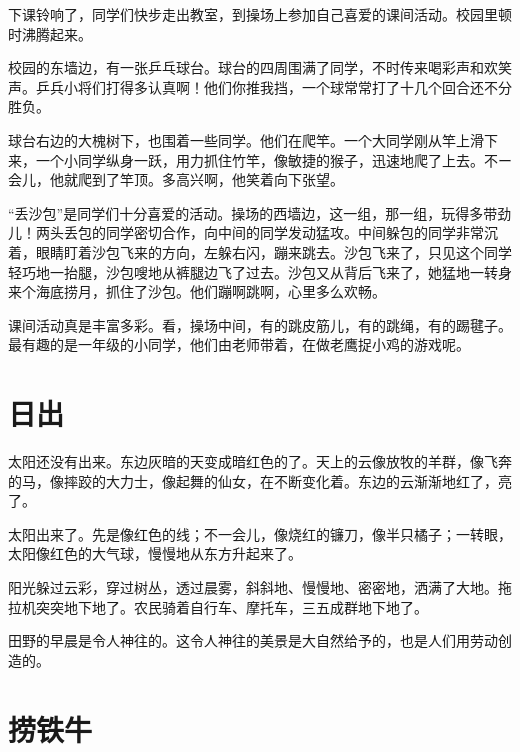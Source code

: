\documentclass[12pt,UTF-8,openany]{ctexbook}
\begin{document}
\begin{Large}
    
    下课铃响了，同学们快步走出教室，到操场上参加自己喜爱的课间活动。校园里顿时沸腾起来。
    
    校园的东墙边，有一张乒乓球台。球台的四周围满了同学，不时传来喝彩声和欢笑声。乒兵小将们打得多认真啊！他们你推我挡，一个球常常打了十几个回合还不分胜负。
    
    球台右边的大槐树下，也围着一些同学。他们在爬竿。一个大同学刚从竿上滑下来，一个小同学纵身一跃，用力抓住竹竿，像敏捷的猴子，迅速地爬了上去。不ー会儿，他就爬到了竿顶。多高兴啊，他笑着向下张望。
    
    “丢沙包”是同学们十分喜爱的活动。操场的西墙边，这一组，那一组，玩得多带劲儿！两头丢包的同学密切合作，向中间的同学发动猛攻。中间躲包的同学非常沉着，眼睛盯着沙包飞来的方向，左躲右闪，蹦来跳去。沙包飞来了，只见这个同学轻巧地一抬腿，沙包嗖地从裤腿边飞了过去。沙包又从背后飞来了，她猛地一转身来个海底捞月，抓住了沙包。他们蹦啊跳啊，心里多么欢畅。
    
    课间活动真是丰富多彩。看，操场中间，有的跳皮筋儿，有的跳绳，有的踢毽子。最有趣的是一年级的小同学，他们由老师带着，在做老鹰捉小鸡的游戏呢。
    
\end{Large}

\chapter{日出}

\begin{Large}
    
    太阳还没有出来。东边灰暗的天变成暗红色的了。天上的云像放牧的羊群，像飞奔的马，像摔跤的大力士，像起舞的仙女，在不断变化着。东边的云渐渐地红了，亮了。
    
    太阳出来了。先是像红色的线；不一会儿，像烧红的镰刀，像半只橘子；一转眼，太阳像红色的大气球，慢慢地从东方升起来了。
    
    阳光躲过云彩，穿过树丛，透过晨雾，斜斜地、慢慢地、密密地，洒满了大地。拖拉机突突地下地了。农民骑着自行车、摩托车，三五成群地下地了。
    
    田野的早晨是令人神往的。这令人神往的美景是大自然给予的，也是人们用劳动创造的。
    
\end{Large}

\chapter{捞铁牛}
\end{document}
